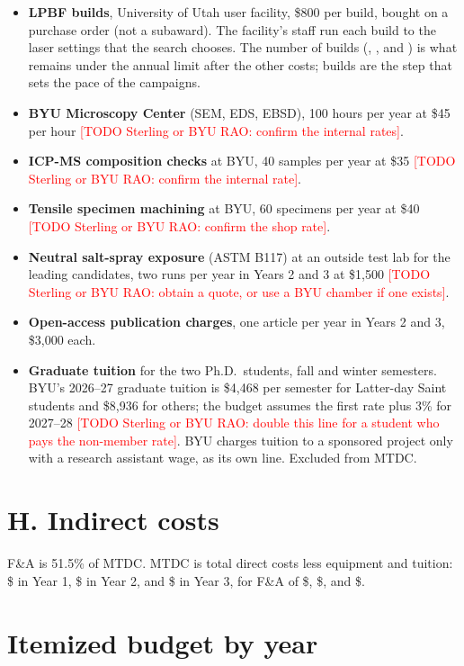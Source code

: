 \documentclass[11pt,letterpaper]{article}
\newcommand{\todo}[1]{\textcolor{red}{[TODO Sterling or BYU RAO: #1]}}
\begin{document}
\begin{itemize}\setlength{\itemsep}{1pt}
\item \textbf{LPBF builds}, University of Utah user facility, \$800 per build,
bought on a purchase order (not a subaward). The facility's staff run each
build to the laser settings that the search chooses. The number of builds
(\BuildsYearOne, \BuildsYearTwo, and \BuildsYearThree) is what remains
under the annual limit after the other costs; builds are the step that sets
the pace of the campaigns.
\item \textbf{BYU Microscopy Center} (SEM, EDS, EBSD), 100 hours per year at
\$45 per hour \todo{confirm the internal rates}.
\item \textbf{ICP-MS composition checks} at BYU, 40 samples per year at \$35
\todo{confirm the internal rate}.
\item \textbf{Tensile specimen machining} at BYU, 60 specimens per year at \$40
\todo{confirm the shop rate}.
\item \textbf{Neutral salt-spray exposure} (ASTM B117) at an outside test lab
for the leading candidates, two runs per year in Years 2 and 3 at \$1,500
\todo{obtain a quote, or use a BYU chamber if one exists}.
\item \textbf{Open-access publication charges}, one article per year in Years
2 and 3, \$3,000 each.
\item \textbf{Graduate tuition} for the two Ph.D.\ students, fall and winter
semesters. BYU's 2026--27 graduate tuition is \$4,468 per semester for
Latter-day Saint students and \$8,936 for others; the budget assumes the
first rate plus 3\% for 2027--28 \todo{double this line for a student who
pays the non-member rate}. BYU charges tuition to a sponsored project only
with a research assistant wage, as its own line. Excluded from MTDC.
\end{itemize}

\section*{H. Indirect costs}

F\&A is 51.5\% of MTDC. MTDC is total direct costs less equipment and tuition:
\$\MTDCYearOne{} in Year 1, \$\MTDCYearTwo{} in Year 2, and \$\MTDCYearThree{}
in Year 3, for F\&A of \$\FAYearOne, \$\FAYearTwo, and \$\FAYearThree.

\section*{Itemized budget by year}


\end{document}
